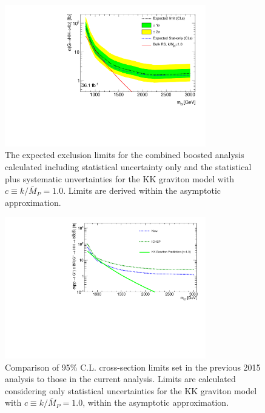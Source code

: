 \begin{figure}
\begin{center}
\includegraphics[angle=270, width=0.78\textwidth]{figures/boosted/Limit_Stat/limit_combined_RSG10_june29.pdf}
\caption{The expected exclusion limits for the combined boosted analysis calculated including statistical uncertainty only and the statistical plus systematic unvertainties for the KK graviton model with $c \equiv k/\bar{M}_P = 1.0$. Limits are derived within the asymptotic approximation.}
\label{fig:brazil_hh_boosted_all_c10_stat}
\end{center}
\end{figure}

\begin{figure}
\begin{center}
\includegraphics[angle=270, width=0.78\textwidth]{figures/boosted/Limit_Stat/CompareLimits_HH_Boosted_full2016-ICHEP_c10_ratio.pdf}
\caption{Comparison of 95\% C.L. cross-section limits set in the previous 2015 analysis \cite{ATLAS-CONF-2016-017} to those in the current analysis. Limits are calculated considering only statistical uncertainties for the KK graviton model with $c \equiv k/\bar{M}_P = 1.0$, within the asymptotic approximation.}
\label{fig:Limits_2017_ICHEP_StatOnly}
\end{center}
\end{figure}
\clearpage


